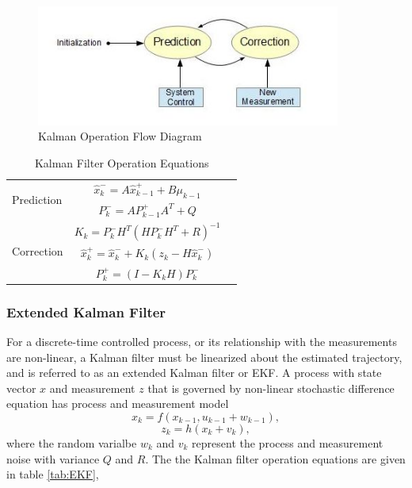 \begin{figure}[h]
\centering
\includegraphics[width=10cm, keepaspectratio=true]{./Figures/KalmanOperation.jpg}
\caption{Kalman Operation Flow Diagram}
\label{figch2:1}
\end{figure}

\begin{table}
\caption{Kalman Filter Operation Equations}
\label{tab:KF}
\centering
\begin{tabular}{|l|c r|}
\hline
\multirow{2}{*}{Prediction} 
& $\hat{x}^-_k=A\hat{x}^+_{k-1}+B\mu_{k-1}$ & \stepcounter{equation}\thetag{\theequation}\\
& $P^-_k = AP^+_{k-1}A^T+Q$ & \stepcounter{equation}\thetag{\theequation}\\
\hline
\multirow{3}{*}{Correction}
& $K_k=P^-_kH^T(HP^-_kH^T+R)^{-1}$  & \stepcounter{equation}\thetag{\theequation}\\
& $\hat{x}^+_k = \hat{x}^-_k+K_k(z_k-H\hat{x}^-_k)$ & \stepcounter{equation}\thetag{\theequation}\\
& $P^+_k = (I-K_kH)P^-_k$ & \stepcounter{equation}\thetag{\theequation}\\
\hline
\end{tabular}
\end{table}
\FloatBarrier

\subsubsection{Extended Kalman Filter}
For a discrete-time controlled process, or its relationship with the
measurements are non-linear, a Kalman filter must be linearized about
the estimated trajectory, and is referred to as an extended Kalman
filter or EKF. A process with state vector $x$ and measurement $z$
that is governed by non-linear stochastic difference equation has
process and measurement model 
\begin{equation}
x_k=f(x_{k-1}, u_{k-1}+w_{k-1}),
\end{equation}
\begin{equation}
z_k=h(x_k+v_k),
\end{equation}
\noindent where the random varialbe $w_k$ and $v_k$ represent the
process and measurement noise with variance $Q$ and $R$. The the
Kalman filter operation equations are given in table
\ref{tab:EKF},


